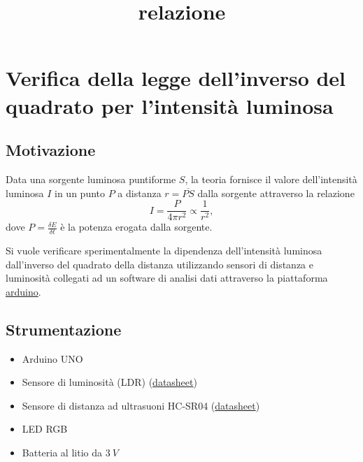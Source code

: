 \documentclass[11pt]{article}
\title{relazione}
\providecommand{\tightlist}{%
      \setlength{\itemsep}{0pt}\setlength{\parskip}{0pt}}
\begin{document}
    
    
    \maketitle
    
    

    
    \hypertarget{verifica-della-legge-dellinverso-del-quadrato-per-lintensituxe0-luminosa}{%
\section{Verifica della legge dell'inverso del quadrato per l'intensità
luminosa}\label{verifica-della-legge-dellinverso-del-quadrato-per-lintensituxe0-luminosa}}

    \hypertarget{motivazione}{%
\subsection{Motivazione}\label{motivazione}}

Data una sorgente luminosa puntiforme \(S\), la teoria fornisce il
valore dell'intensità luminosa \(I\) in un punto \(P\) a distanza
\(r=\overline{PS}\) dalla sorgente attraverso la relazione
\[I=\frac{P}{4\pi r^2}\propto \frac{1}{r^2},\] dove
\(P=\frac{\delta E}{\delta t}\) è la potenza erogata dalla sorgente.

Si vuole verificare sperimentalmente la dipendenza dell'intensità
luminosa dall'inverso del quadrato della distanza utilizzando sensori di
distanza e luminosità collegati ad un software di analisi dati
attraverso la piattaforma \href{https://www.arduino.cc/}{arduino}.

    \hypertarget{strumentazione}{%
\subsection{Strumentazione}\label{strumentazione}}

\begin{itemize}
\tightlist
\item
  Arduino UNO
\item
  Sensore di luminosità (LDR)
  (\href{https://cdn-learn.adafruit.com/downloads/pdf/photocells.pdf}{datasheet})
\item
  Sensore di distanza ad ultrasuoni HC-SR04
  (\href{https://www.electroschematics.com/wp-content/uploads/2013/07/HCSR04-datasheet-version-1.pdf}{datasheet})
\item
  LED RGB
\item
  Batteria al litio da \(3\:V\)
\end{itemize}
\end{document}
